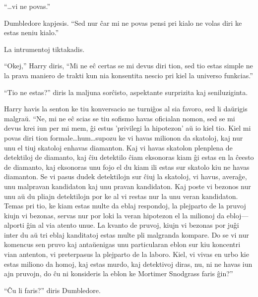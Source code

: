 ``\ldots vi ne povas.''

Dumbledore kapjesis. ``Sed nur ĉar mi ne povas pensi pri kialo ne
volas diri ke estas neniu kialo.''

La intrumentoj tiktakadis.

``Okej,'' Harry diris, ``Mi ne eĉ certas se mi devus diri tion, sed
tio estas simple ne la prava maniero de trakti kun nia konsentita
nescio pri kiel la universo funkcias.''

``Tio ne estas?'' diris la maljuna sorĉisto, aspektante surprizita kaj seniluziginta.

Harry havis la senton ke tiu konversacio ne turniĝos al sia favoro,
sed li daŭrigis malgraŭ. ``Ne, mi ne eĉ scias se tiu sofismo havas
oficialan nomon, sed se mi devus krei iun per mi mem, ĝi estus
'privilegi la hipotezon' aŭ io kiel tio. Kiel mi povas diri tion
formale\ldots hum\ldots supozu ke vi havas milionon da skatoloj, kaj
nur unu el tiuj skatoloj enhavas diamanton. Kaj vi havas skatolon
plenplena de detektiloj de diamanto, kaj ĉiu detektilo ĉiam eksonoras
kiam ĝi estas en la ĉeesto de diamanto, kaj eksonoras unu fojo el du kiam
ili estas sur skatolo kiu ne havas diamanton. Se vi pasus dudek
detektilojn sur ĉiuj la skatoloj, vi havus, averaĝe, unu malpravan
kandidaton kaj unu pravan kandidaton. Kaj poste vi bezonos nur unu aŭ
du pliajn detektilojn por ke al vi restas nur la unu veran
kandidaton. Temas pri tio, ke kiam estas multe da eblaj respondoj, la
plejparto de la pruvoj kiujn vi bezonas, servas nur por loki la veran
hipotezon el la milionoj da ebloj—alporti ĝin al via atento unue. La
kvanto de pruvoj, kiujn vi bezonas por juĝi inter du aŭ tri eblaj
kanditatoj estas multe pli malgranda kompare. Do se vi nur komencus
sen pruvo kaj antaŭenigas unu particularan eblon sur kiu koncentri
vian antenton, vi preterpasus la plejparto de la laboro. Kiel, vi
vivas en urbo kie estas miliono da homoj, kaj estas murdo, kaj
detektivoj diras, nu, ni ne havas iun ajn pruvojn, do ĉu ni konsideris
la eblon ke Mortimer Snodgrass faris ĝin?''

``Ĉu li faris?'' diris Dumbledore.

